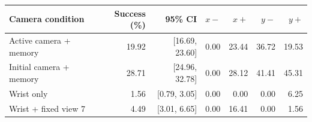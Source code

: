 \begin{tabular}{lrrrrrr}
\hline
Camera condition & Success (\%) & 95\% CI & $x-$ & $x+$ & $y-$ & $y+$ \\
\hline
Active camera + memory & 19.92 & [16.69, 23.60] & 0.00 & 23.44 & 36.72 & 19.53 \\
Initial camera + memory & 28.71 & [24.96, 32.78] & 0.00 & 28.12 & 41.41 & 45.31 \\
Wrist only & 1.56 & [0.79, 3.05] & 0.00 & 0.00 & 0.00 & 6.25 \\
Wrist + fixed view 7 & 4.49 & [3.01, 6.65] & 0.00 & 16.41 & 0.00 & 1.56 \\
\hline
\end{tabular}
